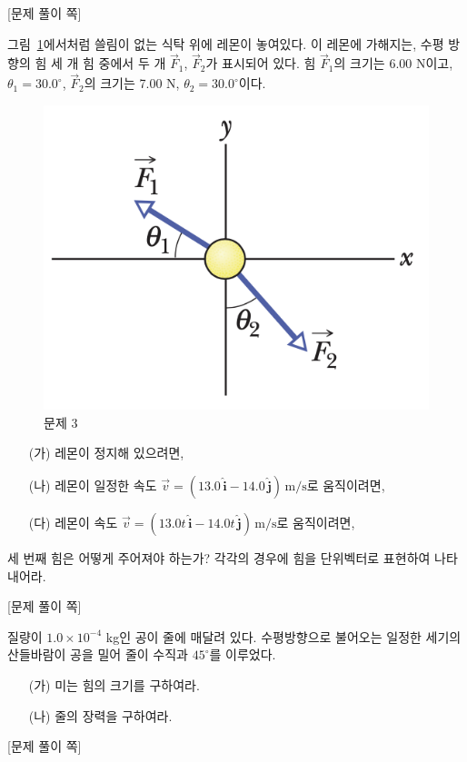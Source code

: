 \documentclass[floatfix,nofootinbib,superscriptaddress,fleqn,preprint]{revtex4}
\begin{document}
{\color{gray} [문제 풀이 쪽]}

\newpage 

 그림~\ref{fig:3}에서처럼 쓸림이 없는 식탁 위에 레몬이 놓여있다. 이
 레몬에 가해지는, 수평 방향의 힘 세 개 힘 중에서  두 개 $\vec{F}_1$,
 $\vec{F}_2$가 표시되어 있다. 힘 $\vec{F}_1$의 크기는 6.00 N이고,
$\theta_1=30.0^\circ$, $\vec{F}_2$의 크기는 7.00 N,
$\theta_2=30.0^\circ$이다. 
\begin{figure}[ht]
  \centering
\includegraphics[scale=0.6]{Qfig6-3-20220316.png}  
  \caption{문제 3}
  \label{fig:3}
\end{figure}
\begin{itemize}
\item[(가)] 레몬이 정지해 있으려면,
\item[(나)] 레몬이 일정한 속도 $\vec{v} =(13.0\,\hat{\bm{i}} -
  14.0\,\hat{\bm{j}})\,\mathrm{m/s}$로 움직이려면, 
\item[(다)] 레몬이 속도 $\vec{v} =(13.0t\,\hat{\bm{i}} -
  14.0t\,\hat{\bm{j}})\,\mathrm{m/s}$로 움직이려면, 
\end{itemize}
세 번째 힘은 어떻게 주어져야 하는가? 각각의 경우에 힘을 단위벡터로
표현하여 나타내어라. 
 
\newpage

{\color{gray} [문제 풀이 쪽]}

\newpage

질량이 $1.0\times 10^{-4}$ kg인 공이 줄에 매달려 있다. 수평방향으로
불어오는 일정한 세기의 산들바람이 공을 밀어 줄이 수직과 $45^\circ$를
이루었다.
\begin{itemize}
\item[(가)] 미는 힘의 크기를 구하여라.
\item[(나)] 줄의 장력을 구하여라.
\end{itemize}
\newpage

{\color{gray} [문제 풀이 쪽]}

\newpage
\end{document}
